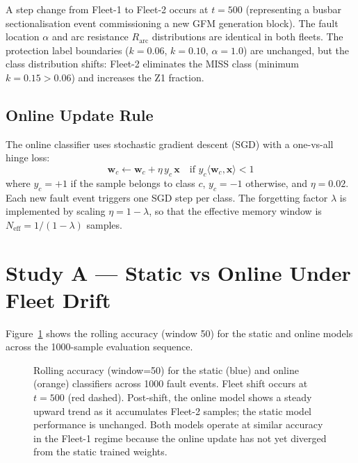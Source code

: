 \documentclass[11pt,a4paper]{article}
\begin{document}
A step change from Fleet-1 to Fleet-2 occurs at $t=500$ (representing a
busbar sectionalisation event commissioning a new GFM generation block).
The fault location $\alpha$ and arc resistance $R_\mathrm{arc}$ distributions
are identical in both fleets.  The protection label boundaries ($k=0.06$,
$k=0.10$, $\alpha=1.0$) are unchanged, but the class distribution shifts:
Fleet-2 eliminates the MISS class (minimum $k=0.15>0.06$) and increases the
Z1 fraction.

\subsection*{Online Update Rule}

The online classifier uses stochastic gradient descent (SGD) with a one-vs-all
hinge loss:
\begin{equation}
  \mathbf{w}_c \leftarrow \mathbf{w}_c + \eta\, y_c\, \mathbf{x}
  \quad \text{if } y_c\langle \mathbf{w}_c, \mathbf{x}\rangle < 1
\end{equation}
where $y_c = +1$ if the sample belongs to class $c$, $y_c=-1$ otherwise, and
$\eta=0.02$.  Each new fault event triggers one SGD step per class.  The
forgetting factor $\lambda$ is implemented by scaling $\eta = 1-\lambda$, so
that the effective memory window is $N_\mathrm{eff}=1/(1-\lambda)$ samples.

\section{Study A --- Static vs Online Under Fleet Drift}
\label{sec:studyA}

Figure~\ref{fig:drift} shows the rolling accuracy (window 50) for the static
and online models across the 1000-sample evaluation sequence.

\begin{figure}[htbp]
  \centering
  \resizebox{0.96\textwidth}{!}{}
  \caption{Rolling accuracy (window=50) for the static (blue) and online
           (orange) classifiers across 1000 fault events.  Fleet shift occurs
           at $t=500$ (red dashed).  Post-shift, the online model shows a
           steady upward trend as it accumulates Fleet-2 samples; the static
           model performance is unchanged.  Both models operate at similar
           accuracy in the Fleet-1 regime because the online update has not
           yet diverged from the static trained weights.}
  \label{fig:drift}
\end{figure}
\end{document}
